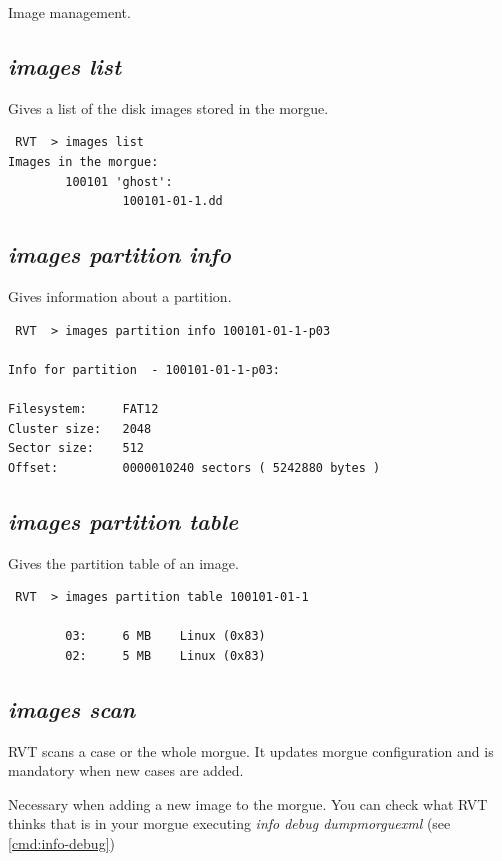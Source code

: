 \documentclass[a4paper,11pt,oneside]{report}
\begin{document}
Image management.



\subsection{\emph{images list}}

Gives a list of the disk images stored in the morgue.

\begin{verbatim}
 RVT  > images list
Images in the morgue: 
        100101 'ghost':
                100101-01-1.dd

\end{verbatim}



\subsection{\emph{images partition info}}

Gives information about a partition.

\begin{verbatim}
 RVT  > images partition info 100101-01-1-p03                                 

Info for partition  - 100101-01-1-p03:

Filesystem:     FAT12
Cluster size:   2048
Sector size:    512
Offset:         0000010240 sectors ( 5242880 bytes )
\end{verbatim}

\subsection{\emph{images partition table}}

Gives the partition table of an image.

\begin{verbatim}
 RVT  > images partition table 100101-01-1

        03:     6 MB    Linux (0x83)
        02:     5 MB    Linux (0x83)
\end{verbatim}


\subsection{\emph{images scan}}

RVT scans a case or the whole morgue. It updates morgue configuration and is mandatory when new cases are added.

Necessary when adding a new image to the morgue. You can check what RVT thinks that is in your morgue executing \emph{info debug dumpmorguexml} (see \ref{cmd:info-debug})
\end{document}

